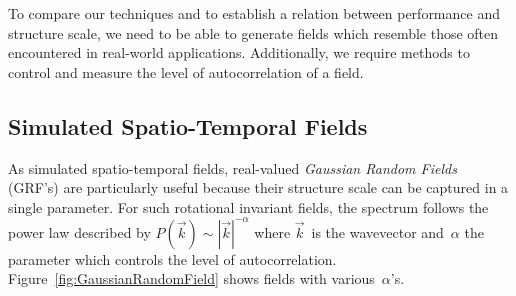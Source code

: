 \documentclass[ijgi,article,submit,moreauthors,pdftex,10pt,a4paper]{Definitions/mdpi}
\begin{document}



To compare our techniques and to establish a relation between performance and structure scale, we need to be able to generate fields which resemble those often encountered in real-world applications. Additionally, we require methods to control and measure the level of autocorrelation of a field.

\subsection{Simulated Spatio-Temporal Fields}
\label{sec:Materials and Methods/Simulated Spatio-Temporal Fields}

As simulated spatio-temporal fields, real-valued \textit{Gaussian Random Fields} (GRF's) are particularly useful because their structure scale can be captured in a single parameter. For such rotational invariant fields, the spectrum follows the power law described by $P(\vec{k}) \sim |\vec{k}|^{-\alpha}$ where $\vec{k} \,$ is the wavevector and~$\alpha$ the parameter which controls the level of autocorrelation. Figure~\ref{fig:GaussianRandomField} shows fields with various~$\alpha$'s.
\end{document}
